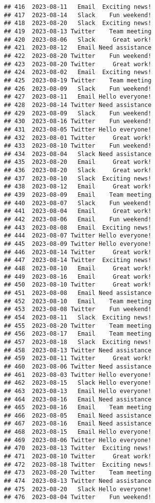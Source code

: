 \documentclass[
]{article}
\begin{document}
\begin{verbatim}
## 416  2023-08-11   Email  Exciting news!
## 417  2023-08-14   Slack    Fun weekend!
## 418  2023-08-20   Slack  Exciting news!
## 419  2023-08-13 Twitter    Team meeting
## 420  2023-08-06   Slack     Great work!
## 421  2023-08-12   Email Need assistance
## 422  2023-08-20 Twitter    Fun weekend!
## 423  2023-08-20 Twitter     Great work!
## 424  2023-08-02   Email  Exciting news!
## 425  2023-08-19 Twitter    Team meeting
## 426  2023-08-09   Slack    Fun weekend!
## 427  2023-08-11   Email Hello everyone!
## 428  2023-08-14 Twitter Need assistance
## 429  2023-08-09   Slack    Fun weekend!
## 430  2023-08-16 Twitter    Fun weekend!
## 431  2023-08-05 Twitter Hello everyone!
## 432  2023-08-01 Twitter     Great work!
## 433  2023-08-10 Twitter    Fun weekend!
## 434  2023-08-04   Slack Need assistance
## 435  2023-08-20   Email     Great work!
## 436  2023-08-20   Slack     Great work!
## 437  2023-08-10   Slack  Exciting news!
## 438  2023-08-12   Email     Great work!
## 439  2023-08-09   Email    Team meeting
## 440  2023-08-07   Slack    Fun weekend!
## 441  2023-08-04   Email     Great work!
## 442  2023-08-06   Email    Fun weekend!
## 443  2023-08-08   Email  Exciting news!
## 444  2023-08-07 Twitter Hello everyone!
## 445  2023-08-09 Twitter Hello everyone!
## 446  2023-08-14 Twitter     Great work!
## 447  2023-08-14 Twitter  Exciting news!
## 448  2023-08-10   Email     Great work!
## 449  2023-08-16   Email     Great work!
## 450  2023-08-10 Twitter     Great work!
## 451  2023-08-08   Email Need assistance
## 452  2023-08-10   Email    Team meeting
## 453  2023-08-08 Twitter    Fun weekend!
## 454  2023-08-11   Slack  Exciting news!
## 455  2023-08-20 Twitter    Team meeting
## 456  2023-08-17   Email    Team meeting
## 457  2023-08-18   Slack  Exciting news!
## 458  2023-08-13 Twitter Need assistance
## 459  2023-08-11 Twitter     Great work!
## 460  2023-08-06 Twitter Need assistance
## 461  2023-08-03 Twitter Hello everyone!
## 462  2023-08-15   Slack Hello everyone!
## 463  2023-08-13   Email Hello everyone!
## 464  2023-08-16   Email Need assistance
## 465  2023-08-16   Email    Team meeting
## 466  2023-08-05   Email Need assistance
## 467  2023-08-16   Email Need assistance
## 468  2023-08-15   Email Hello everyone!
## 469  2023-08-06 Twitter Hello everyone!
## 470  2023-08-13 Twitter  Exciting news!
## 471  2023-08-10 Twitter     Great work!
## 472  2023-08-18 Twitter  Exciting news!
## 473  2023-08-20 Twitter    Team meeting
## 474  2023-08-13 Twitter Need assistance
## 475  2023-08-20   Slack Hello everyone!
## 476  2023-08-04 Twitter    Fun weekend!

\end{verbatim}
\end{document}
